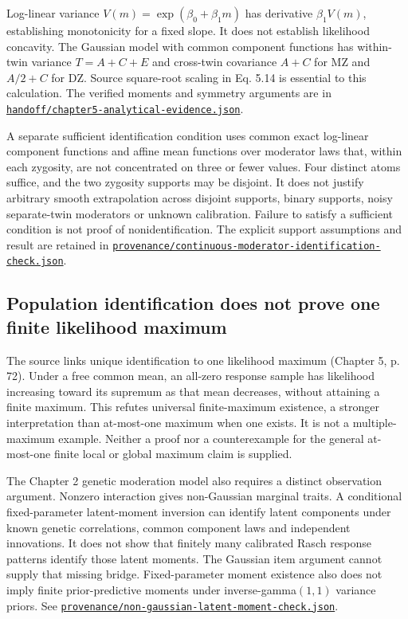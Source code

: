 \documentclass[11pt]{article}
\newcommand{\file}[1]{\href{https://github.com/alectionary/vibe-math/blob/master/formalization/schwabe-psychometric-genetics/#1}{\nolinkurl{#1}}}
\begin{document}
Log-linear variance $V(m)=\exp(\beta_0+\beta_1m)$ has derivative $\beta_1V(m)$, establishing monotonicity for a fixed slope. It does not establish likelihood concavity. The Gaussian model with common component functions has within-twin variance $T=A+C+E$ and cross-twin covariance $A+C$ for MZ and $A/2+C$ for DZ. Source square-root scaling in Eq. 5.14 is essential to this calculation. The verified moments and symmetry arguments are in \file{handoff/chapter5-analytical-evidence.json}.

A separate sufficient identification condition uses common exact log-linear component functions and affine mean functions over moderator laws that, within each zygosity, are not concentrated on three or fewer values. Four distinct atoms suffice, and the two zygosity supports may be disjoint. It does not justify arbitrary smooth extrapolation across disjoint supports, binary supports, noisy separate-twin moderators or unknown calibration. Failure to satisfy a sufficient condition is not proof of nonidentification. The explicit support assumptions and result are retained in \file{provenance/continuous-moderator-identification-check.json}.

\subsection{Population identification does not prove one finite likelihood maximum}
The source links unique identification to one likelihood maximum (Chapter 5, p. 72). Under a free common mean, an all-zero response sample has likelihood increasing toward its supremum as that mean decreases, without attaining a finite maximum. This refutes universal finite-maximum existence, a stronger interpretation than at-most-one maximum when one exists. It is not a multiple-maximum example. Neither a proof nor a counterexample for the general at-most-one finite local or global maximum claim is supplied.

The Chapter 2 genetic moderation model also requires a distinct observation argument. Nonzero interaction gives non-Gaussian marginal traits. A conditional fixed-parameter latent-moment inversion can identify latent components under known genetic correlations, common component laws and independent innovations. It does not show that finitely many calibrated Rasch response patterns identify those latent moments. The Gaussian item argument cannot supply that missing bridge. Fixed-parameter moment existence also does not imply finite prior-predictive moments under inverse-gamma$(1,1)$ variance priors. See \file{provenance/non-gaussian-latent-moment-check.json}.
\end{document}
